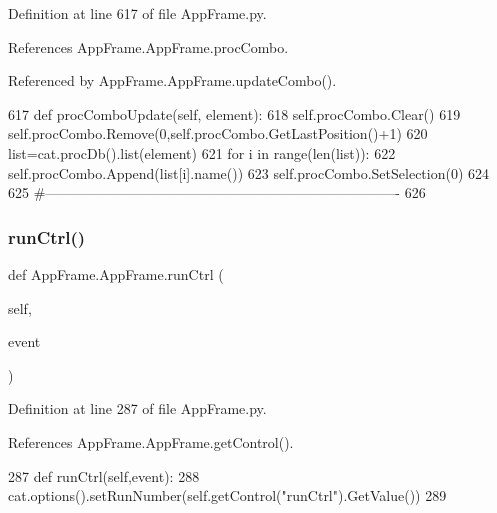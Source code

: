 Definition at line 617 of file App\+Frame.\+py.



References App\+Frame.\+App\+Frame.\+proc\+Combo.



Referenced by App\+Frame.\+App\+Frame.\+update\+Combo().


\begin{DoxyCode}
617     \textcolor{keyword}{def }procComboUpdate(self, element):
618         self.procCombo.Clear()
619         self.procCombo.Remove(0,self.procCombo.GetLastPosition()+1)
620         list=cat.procDb().list(element)
621         \textcolor{keywordflow}{for} i \textcolor{keywordflow}{in} range(len(list)):
622             self.procCombo.Append(list[i].name())
623         self.procCombo.SetSelection(0)    
624  
625 \textcolor{comment}{#----------------------------------------------------------------------------}
626 \end{DoxyCode}
\mbox{\label{classAppFrame_1_1AppFrame_ab58d0d5681ba072d05d5a1675aafb4a8}} 
\subsubsection{\texorpdfstring{run\+Ctrl()}{runCtrl()}}
{\footnotesize\ttfamily def App\+Frame.\+App\+Frame.\+run\+Ctrl (\begin{DoxyParamCaption}\item[{}]{self,  }\item[{}]{event }\end{DoxyParamCaption})}



Definition at line 287 of file App\+Frame.\+py.



References App\+Frame.\+App\+Frame.\+get\+Control().


\begin{DoxyCode}
287     \textcolor{keyword}{def }runCtrl(self,event):
288         cat.options().setRunNumber(self.getControl(\textcolor{stringliteral}{"runCtrl"}).GetValue()) 
289 
\end{DoxyCode}
\mbox{\label{classAppFrame_1_1AppFrame_a3d3c4190823e126799c77104abb1be71}} 

